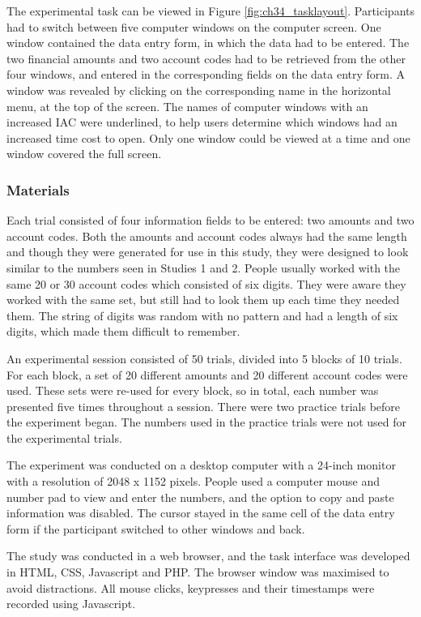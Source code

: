 \begin{table}
\begin{enumerate}
The experimental task can be viewed in Figure \ref{fig:ch34_tasklayout}. Participants had to switch between five computer windows on the computer screen. One window contained the data entry form, in which the data had to be entered. The two financial amounts and two account codes had to be retrieved from the other four windows, and entered in the corresponding fields on the data entry form. A window was revealed by clicking on the corresponding name in the horizontal menu, at the top of the screen. The names of computer windows with an increased IAC were underlined, to help users determine which windows had an increased time cost to open. Only one window could be viewed at a time and one window covered the full screen. 


\subsubsection{Materials}
Each trial consisted of four information fields to be entered: two amounts and two account codes. Both the amounts and account codes always had the same length and though they were generated for use in this study, they were designed to look similar to the numbers seen in Studies 1 and 2. People usually worked with the same 20 or 30 account codes which consisted of six digits. They were aware they worked with the same set, but still had to look them up each time they needed them. The string of digits was random with no pattern and had a length of six digits, which made them difficult to remember.

An experimental session consisted of 50 trials, divided into 5 blocks of 10 trials. For each block, a set of 20 different amounts and 20 different account codes were used. These sets were re-used for every block, so in total, each number was presented five times throughout a session. There were two practice trials before the experiment began. The numbers used in the practice trials were not used for the experimental trials.

The experiment was conducted on a desktop computer with a 24-inch monitor with a resolution of 2048 x 1152 pixels. People used a computer mouse and number pad to view and enter the numbers, and the option to copy and paste information was disabled. The cursor stayed in the same cell of the data entry form if the participant switched to other windows and back. 

The study was conducted in a web browser, and the task interface was developed in HTML, CSS, Javascript and PHP. The browser window was maximised to avoid distractions. All mouse clicks, keypresses and their timestamps were recorded using Javascript.


\end{enumerate}
\end{table}
